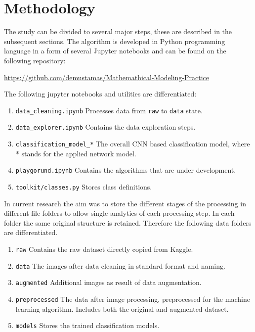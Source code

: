 \documentclass[10pt, final]{article}
\begin{document}
\section{Methodology} \label{sec:method}
The study can be divided to several major steps, these are described in the subsequent sections.
The algorithm is developed in Python programming language in a form of several Jupyter notebooks and can
be found on the following repository:

\noindent
\url{https://github.com/demustamas/Mathemathical-Modeling-Practice}

The following jupyter notebooks and utilities are differentiated:
\begin{enumerate}
	\item \lstinline{data_cleaning.ipynb} Processes data from \lstinline{raw} to \lstinline{data} state.
	\item \lstinline{data_explorer.ipynb} Contains the data exploration steps.
	\item \lstinline{classification_model_*} The overall CNN based classification model,
	      where * stands for the applied network model.
	\item \lstinline{playgorund.ipynb} Contains the algorithms that are under development.
	\item \lstinline{toolkit/classes.py} Stores class definitions.
\end{enumerate}

In current research the aim was to store the different stages of the processing in different file
folders to allow single analytics of each processing step.
In each folder the same original structure is retained.
Therefore the following data folders are differentiated.
\begin{enumerate}
	\item \lstinline{raw} Contains the raw dataset directly copied from Kaggle.
	\item \lstinline{data} The images after data cleaning in standard format and naming.
	\item \lstinline{augmented} Additional images as result of data augmentation.
	\item \lstinline{preprocessed} The data after image processing, preprocessed for the machine learning
	      algorithm. Includes both the original and augmented dataset.
	\item \lstinline{models} Stores the trained classification models.
\end{enumerate}
\end{document}
